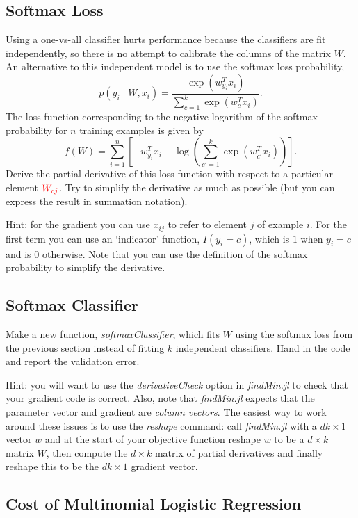 \documentclass{article}
\def\blu#1{{\color{blu}#1}}
\def\red#1{{\color{red}#1}}
\def\cond{\; | \;}
\begin{document}
\subsection{Softmax Loss}

Using a one-vs-all classifier hurts performance because the classifiers are fit independently, so there is no attempt to calibrate the columns of the matrix $W$. An alternative to this independent model is to use the softmax loss probability,
\[
p(y_i \cond W, x_i) = \frac{\exp(w_{y_i}^Tx_i)}{\sum_{c=1}^k\exp(w_c^Tx_i)}.
\]
The loss function corresponding to the negative logarithm of the softmax probability for $n$ training examples is given by
\[
f(W) = \sum_{i=1}^n \left[-w_{y_i}^Tx_i + \log\left(\sum_{c' = 1}^k \exp(w_{c'}^Tx_i)\right)\right].
\]
\blu{Derive the partial derivative of this loss function with respect to a particular element $\red{W_{cj}}$}. Try to simplify the derivative as much as possible (but you can express the result in summation notation).


Hint: for the gradient you can use $x_{ij}$ to refer to element $j$ of example $i$. For the first term you can use an `indicator' function, $I(y_i = c)$, which is $1$ when $y_i = c$ and is $0$ otherwise. Note that you can use the definition of the softmax probability to simplify the derivative.



\subsection{Softmax Classifier}

Make a new function, \emph{softmaxClassifier}, which fits $W$ using the softmax loss from the previous section  instead of fitting $k$ independent classifiers. \blu{Hand in the code and report the validation error}.

Hint: you will want to use the \emph{derivativeCheck} option in \emph{findMin.jl} to check that your gradient code is correct. Also, note that \emph{findMin.jl} expects that the parameter vector and gradient are \emph{column vectors}. The easiest way to work around these issues is to use the \emph{reshape} command: call \emph{findMin.jl} with a $dk \times 1$ vector $w$ and at the start of your objective function reshape $w$ to be a $d \times k$ matrix $W$, then compute the $d \times k$ matrix of partial derivatives and finally reshape this to be the $dk \times 1$ gradient vector.

\subsection{Cost of Multinomial Logistic Regression}
\end{document}
